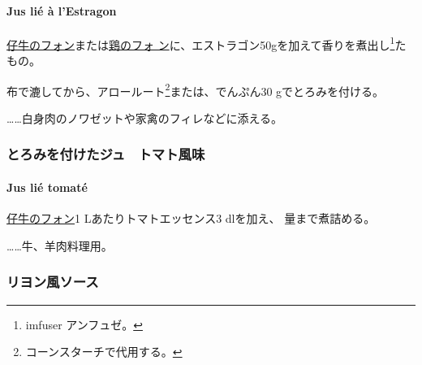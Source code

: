 \hypertarget{jus-lie-a-lestragon}{%
\paragraph{Jus lié à l'Estragon}\label{jus-lie-a-lestragon}}

    

\protect\hyperlink{fonds-de-veau-brun}{仔牛のフォン}または\protect\hyperlink{fonds-de-volaille}{鶏のフォ
ン}に、エストラゴン50gを加えて香りを煮出し\footnote{imfuser アンフュゼ。}た
もの。

布で漉してから、アロールート\footnote{コーンスターチで代用する。}または、でんぷん30
gでとろみを付ける。

\ldots{}\ldots{}白身肉のノワゼットや家禽のフィレなどに添える。

\maeaki

\hypertarget{ux3068ux308dux307fux3092ux4ed8ux3051ux305fux30b8ux30e5ux30c8ux30deux30c8ux98a8ux5473}{%
\subsubsection{とろみを付けたジュ　トマト風味}\label{ux3068ux308dux307fux3092ux4ed8ux3051ux305fux30b8ux30e5ux30c8ux30deux30c8ux98a8ux5473}}

\hypertarget{jus-lie-tomate}{%
\paragraph{Jus lié tomaté}\label{jus-lie-tomate}}


\protect\hyperlink{fonds-de-veau-brun}{仔牛のフォン}1
Lあたりトマトエッセンス3 dlを加え、 \quatrecinquiemes{}量まで煮詰める。

\ldots{}\ldots{}牛、羊肉料理用。

\maeaki

\hypertarget{ux30eaux30e8ux30f3ux98a8ux30bdux30fcux30b9}{%
\subsubsection{リヨン風ソース}\label{ux30eaux30e8ux30f3ux98a8ux30bdux30fcux30b9}}

